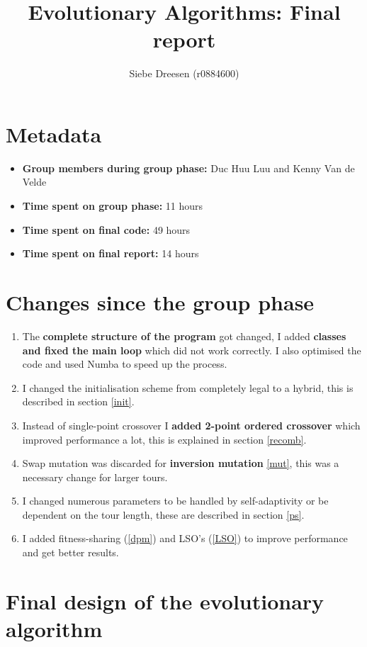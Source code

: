 \documentclass[a4paper,10pt]{article}
\title{Evolutionary Algorithms: Final report}
\author{{Siebe Dreesen (r0884600)}}
\begin{document}
\selectfont{}

\maketitle

\section{Metadata}

\begin{itemize}
\item \textbf{Group members during group phase:} Duc Huu Luu and Kenny Van de Velde
 \item \textbf{Time spent on group phase:} 11 hours
 \item \textbf{Time spent on final code:} 49 hours
 \item \textbf{Time spent on final report:} 14 hours
\end{itemize}

\section{Changes since the group phase} 

\begin{enumerate}
 \item The \textbf{complete structure of the program} got changed, I added \textbf{classes and fixed the main loop} which did not work correctly. I also optimised the code and used Numba to speed up the process.
 \item I changed the initialisation scheme from completely legal to a hybrid, this is described in section \ref{init}.
 \item Instead of single-point crossover I \textbf{added 2-point ordered crossover} which improved performance a lot, this is explained in section \ref{recomb}.
 \item Swap mutation was discarded for \textbf{inversion mutation} \ref{mut}, this was a necessary change for larger tours.
 \item I changed numerous parameters to be handled by self-adaptivity or be dependent on the tour length, these are described in section \ref{ps}.
 \item I added fitness-sharing (\ref{dpm}) and LSO's (\ref{LSO}) to improve performance and get better results.  
\end{enumerate}

\section{Final design of the evolutionary algorithm} 
\end{document}
